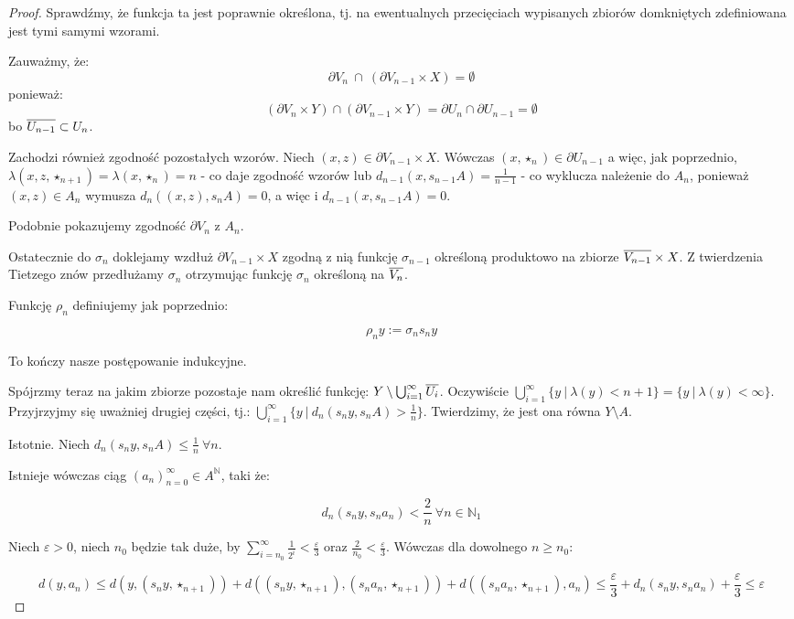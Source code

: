 \begin{thm}
\begin{proof}
  Sprawdźmy, że funkcja ta jest poprawnie określona, tj. na ewentualnych przecięciach wypisanych zbiorów domkniętych zdefiniowana jest tymi samymi wzorami.
  
  Zauważmy, że:
  \[\partial V_n\ \cap\ (\partial V_{n-1} \times X) = \emptyset\]
  ponieważ:
  \[(\partial V_n \times Y) \cap (\partial V_{n-1} \times Y) = \partial U_n \cap \partial U_{n-1} = \emptyset\]
  bo $\overline{U_{n-1}} \subset U_n$.
  
  Zachodzi również zgodność pozostałych wzorów. Niech $(x, z) \in \partial V_{n-1} \times X$. Wówczas $(x, \star_n) \in \partial U_{n-1}$ a więc, jak poprzednio, $\lambda(x, z, \star_{n+1}) = \lambda(x, \star_n) = n$ - co daje zgodność wzorów lub $d_{n-1}(x, s_{n-1} A) = \frac{1}{n-1}$ - co wyklucza należenie do $A_n$, ponieważ $(x, z) \in A_n$ wymusza $d_{n}((x, z), s_{n} A) = 0$, a więc i $d_{n-1}(x, s_{n-1} A) = 0$.
  
  Podobnie pokazujemy zgodność $\partial V_n$ z $A_n$.
  
  Ostatecznie do $\sigma_n$ doklejamy wzdłuż $\partial V_{n-1} \times X$ zgodną z nią funkcję $\sigma_{n-1}$ określoną produktowo na zbiorze $\overline{V_{n-1}} \times X$. Z twierdzenia Tietzego znów przedłużamy $\sigma_n$ otrzymując funkcję $\sigma_n$ określoną na $\overline{V_n}$.
  
  Funkcję $\rho_n$ definiujemy jak poprzednio:
  
  \[\rho_n y := \sigma_n s_n y\]
  
  To kończy nasze postępowanie indukcyjne.

  Spójrzmy teraz na jakim zbiorze pozostaje nam określić funkcję: $Y \setminus \bigcup_{i=1}^\infty \overline{U_i}$. Oczywiście $\bigcup_{i=1}^\infty \{y\ |\ \lambda(y) < n+1\} = \{y\ |\ \lambda(y) < \infty\}$. Przyjrzyjmy się uważniej drugiej części, tj.: $\bigcup_{i=1}^\infty \{y\ |\ d_n(s_n y, s_n A) > \frac{1}{n}\}$. Twierdzimy, że jest ona równa $Y \setminus A$.
  
  Istotnie. Niech $d_n(s_n y, s_n A) \leq \frac{1}{n}\ \forall n$.
  
  Istnieje wówczas ciąg $(a_n)_{n=0}^\infty \in A^\mathbb{N}$, taki że:
  
  \[d_n(s_n y, s_n a_n) < \frac{2}{n}\ \forall n \in \mathbb{N}_1\]
  
  Niech $\varepsilon > 0$, niech $n_0$ będzie tak duże, by $\sum_{i=n_0}^\infty \frac{1}{2^i}< \frac{\varepsilon}{3}$ oraz $\frac{2}{n_0} < \frac{\varepsilon}{3}$. Wówczas dla dowolnego $n \geq n_0$:
  
  \[d(y, a_n) \leq d(y, (s_n y, \star_{n+1})) + d((s_n y, \star_{n+1}), (s_n a_n, \star_{n+1})) + d((s_n a_n, \star_{n+1}), a_n) \leq \frac{\varepsilon}{3} + d_n(s_n y, s_n a_n) + \frac{\varepsilon}{3} \leq \varepsilon\]
  

\end{proof}
\end{thm}
